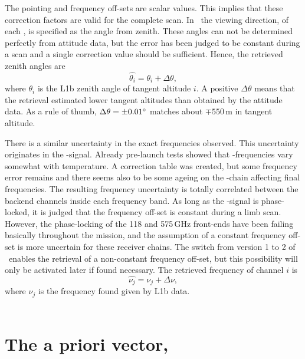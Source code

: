 The pointing and frequency off-sets are scalar values. This implies that these
correction factors are valid for the complete scan. In \ARTS\ the viewing
direction, of each \LOS, is specified as the angle from zenith. These angles
can not be determined perfectly from attitude data, but the error has been
judged to be constant during a scan and a single correction value should be
sufficient. Hence, the retrieved zenith angles are
\begin{equation}
  \label{eq:retr:point}
  \hat{\theta_i} = \theta_i + \Delta\theta,  
\end{equation}
where $\theta_i$ is the L1b zenith angle of tangent altitude $i$. A positive 
$\Delta\theta$ means that the retrieval estimated lower tangent altitudes than
obtained by the attitude data. As a rule of thumb, $\Delta\theta=\pm0.01^\circ$
matches about $\mp550$\,m in tangent altitude.

There is a similar uncertainty in the exact frequencies observed. This
uncertainty originates in the \LO-signal. Already pre-launch tests showed that
\LO-frequencies vary somewhat with temperature. A correction table was created,
but some frequency error remains and there seems also to be some ageing on the
\LO-chain affecting final frequencies. The resulting frequency uncertainty is
totally correlated between the backend channels inside each frequency band. As
long as the \LO-signal is phase-locked, it is judged that the frequency off-set
is constant during a limb scan. However, the phase-locking of the 118 and
575\,GHz front-ends have been failing basically throughout the mission, and the
assumption of a constant frequency off-set is more uncertain for these receiver
chains. The switch from version 1 to 2 of \ARTS\ enables the retrieval of a
non-constant frequency off-set, but this possibility will only be activated later
if found necessary. The retrieved frequency of channel $i$ is
\begin{equation}
  \label{eq:retr:freq}
  \hat{\nu_j} = \nu_j + \Delta\nu,  
\end{equation}
where $\nu_j$ is the frequency found given by L1b data.\\
\\


\section{The a priori vector, }
\label{sec:xa}
%


